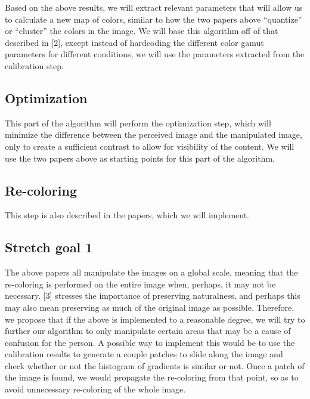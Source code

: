 \documentclass[10pt,twocolumn,letterpaper]{article}
\begin{document}
Based on the above results, we will extract relevant parameters that will allow us to calculate a new map of colors, similar to how the two papers above “quantize” or “cluster” the colors in the image. We will base this algorithm off of that described in [2], except instead of hardcoding the different color gamut parameters for different conditions, we will use the parameters extracted from the calibration step.

\subsection{Optimization}

This part of the algorithm will perform the optimization step, which will minimize the difference between the perceived image and the manipulated image, only to create a sufficient contrast to allow for visibility of the content. We will use the two papers above as starting points for this part of the algorithm. 

\subsection{Re-coloring}

This step is also described in the papers, which we will implement. 

\subsection{Stretch goal 1}

The above papers all manipulate the images on a global scale, meaning that the re-coloring is performed on the entire image when, perhaps, it may not be necessary. [3] stresses the importance of preserving naturalness, and perhaps this may also mean preserving as much of the original image as possible. Therefore, we propose that if the above is implemented to a reasonable degree, we will try to further our algorithm to only manipulate certain areas that may be a cause of confusion for the person. A possible way to implement this would be to use the calibration results to generate a couple patches to slide along the image and check whether or not the histogram of gradients is similar or not. Once a patch of the image is found, we would propagate the re-coloring from that point, so as to avoid unnecessary re-coloring of the whole image.
\end{document}
